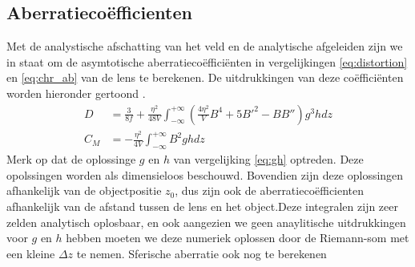 \documentclass[we,twoside,openright,a4paper,11pt]{uantwerpenbamathesis}
\begin{document}
\subsection{Aberratiecoëfficienten}
Met de analystische afschatting van het veld en de analytische afgeleiden zijn we in staat om de asymtotische aberratiecoëfficiënten in vergelijkingen \ref{eq:distortion} en \ref{eq:chr_ab} van de lens te berekenen. De uitdrukkingen van deze coëfficiënten worden hieronder gertoond \cite{PWHawkes}.
\begin{align}
    D&=\frac{3}{8f}+\frac{\eta^2}{48V}\int_{-\infty}^{+\infty}\left(\frac{4\eta^2}{V}B^4+5B'^2-BB''\right)g^3hdz\\
    C_M&=-\frac{\eta^2}{4V}\int_{-\infty}^{+\infty}B^2ghdz
\end{align}
Merk op dat de oplossinge $g$ en $h$ van vergelijking \ref{eq:gh} optreden. Deze opolssingen worden als dimensieloos beschouwd. Bovendien zijn deze oplossingen afhankelijk van de objectpositie $z_0$, dus zijn ook de aberratiecoëfficienten afhankelijk van de afstand tussen de lens en het object.Deze integralen zijn zeer zelden analytisch oplosbaar, en ook aangezien we geen anaylitische uitdrukkingen voor $g$ en $h$ hebben moeten we deze numeriek oplossen door de Riemann-som met een kleine $\Delta z$ te nemen. 
\color{red} Sferische aberratie ook nog te berekenen \color{black}
\end{document}
